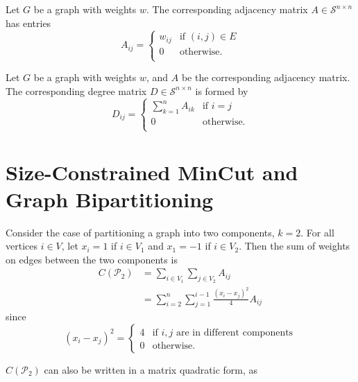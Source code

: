 \begin{definition}
 Let $G$ be a graph with weights $w$.
The corresponding adjacency matrix $A \in \mathcal{S}^{n \times n}$
has entries
\[ A_{ij} = \begin{cases}
   w_{ij} & \text{if } (i,j) \in E \\
   0      & \text{otherwise.} \\
\end{cases} \]
\end{definition}

\begin{definition}
 Let $G$ be a graph with weights $w$, and $A$ be
the corresponding adjacency matrix. The corresponding degree
matrix $D \in \mathcal{S}^{n \times n}$ is formed by 
\[ D_{ij} = \begin{cases}
  \sum_{k = 1}^n A_{ik} & \text{if } i = j \\
  0                     & \text{otherwise.} \\
\end{cases} \]
\end{definition}

\section{Size-Constrained MinCut and Graph Bipartitioning}

Consider the case of partitioning a graph into two components, $k = 2$.
For all vertices $i \in V$, let $x_i = 1$ if $i \in V_1$ and
$x_1 = -1$ if $i \in V_2$. Then the sum of weights on edges between the
two components is
\begin{align*}
C(\mathcal{P}_2)
&= \sum_{i \in V_1} \sum_{j \in V_2} A_{ij} \\
&= \sum_{i = 2}^n \sum_{j = 1}^{i-1} \frac{(x_i - x_j)^2}{4} A_{ij} 
\end{align*}
since
\[ (x_i - x_j)^2 = \begin{cases}
	4 & \mbox{if } i,j \mbox{ are in different components} \\
	0 & \mbox{otherwise.}
\end{cases}\]

$C(\mathcal{P}_2)$ can also be written in a matrix quadratic form, as

